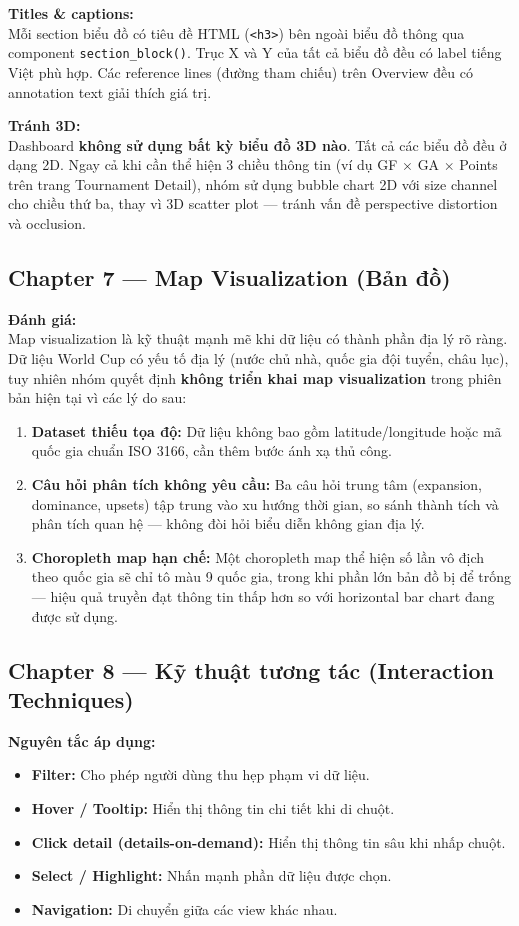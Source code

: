 \documentclass[12pt,a4paper]{article}
\begin{document}
\textbf{Titles \& captions:} \\
Mỗi section biểu đồ có tiêu đề HTML (\texttt{<h3>}) bên ngoài biểu đồ thông qua component \texttt{section\_block()}. Trục X và Y của tất cả biểu đồ đều có label tiếng Việt phù hợp. Các reference lines (đường tham chiếu) trên Overview đều có annotation text giải thích giá trị.

\textbf{Tránh 3D:} \\
Dashboard \textbf{không sử dụng bất kỳ biểu đồ 3D nào}. Tất cả các biểu đồ đều ở dạng 2D. Ngay cả khi cần thể hiện 3 chiều thông tin (ví dụ GF $\times$ GA $\times$ Points trên trang Tournament Detail), nhóm sử dụng bubble chart 2D với size channel cho chiều thứ ba, thay vì 3D scatter plot --- tránh vấn đề perspective distortion và occlusion.

\subsection{Chapter 7 --- Map Visualization (Bản đồ)}
\textbf{Đánh giá:} \\
Map visualization là kỹ thuật mạnh mẽ khi dữ liệu có thành phần địa lý rõ ràng. Dữ liệu World Cup có yếu tố địa lý (nước chủ nhà, quốc gia đội tuyển, châu lục), tuy nhiên nhóm quyết định \textbf{không triển khai map visualization} trong phiên bản hiện tại vì các lý do sau:
\begin{enumerate}
    \item \textbf{Dataset thiếu tọa độ:} Dữ liệu không bao gồm latitude/longitude hoặc mã quốc gia chuẩn ISO 3166, cần thêm bước ánh xạ thủ công.
    \item \textbf{Câu hỏi phân tích không yêu cầu:} Ba câu hỏi trung tâm (expansion, dominance, upsets) tập trung vào xu hướng thời gian, so sánh thành tích và phân tích quan hệ --- không đòi hỏi biểu diễn không gian địa lý.
    \item \textbf{Choropleth map hạn chế:} Một choropleth map thể hiện số lần vô địch theo quốc gia sẽ chỉ tô màu 9 quốc gia, trong khi phần lớn bản đồ bị để trống --- hiệu quả truyền đạt thông tin thấp hơn so với horizontal bar chart đang được sử dụng.
\end{enumerate}

\subsection{Chapter 8 --- Kỹ thuật tương tác (Interaction Techniques)}
\textbf{Nguyên tắc áp dụng:}
\begin{itemize}
    \item \textbf{Filter:} Cho phép người dùng thu hẹp phạm vi dữ liệu.
    \item \textbf{Hover / Tooltip:} Hiển thị thông tin chi tiết khi di chuột.
    \item \textbf{Click detail (details-on-demand):} Hiển thị thông tin sâu khi nhấp chuột.
    \item \textbf{Select / Highlight:} Nhấn mạnh phần dữ liệu được chọn.
    \item \textbf{Navigation:} Di chuyển giữa các view khác nhau.
\end{itemize}
\end{document}
